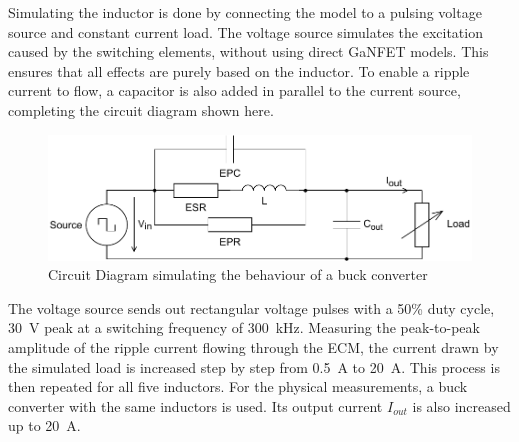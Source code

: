 Simulating the inductor is done by connecting the model to a pulsing voltage source and constant current load. The voltage source simulates the excitation caused by the switching elements, without using direct \ac{GaNFET} models. This ensures that all effects are purely based on the inductor. To enable a ripple current to flow, a capacitor is also added in parallel to the current source, completing the circuit diagram shown here.
\begin{figure}[H]
    \centering
    \includegraphics[width=1\linewidth]{Bilder/Kapitel4/Saturation_Validation_ECM.pdf}
    \caption{Circuit Diagram simulating the behaviour of a buck converter}
    \label{fig:saturation_validation_circuit_diagramm}
\end{figure}
The voltage source sends out rectangular voltage pulses with a 50\% duty cycle, \SI{30}{\V} peak at a switching frequency of \SI{300}{\kilo\Hz}. Measuring the peak-to-peak amplitude of the ripple current flowing through the \ac{ECM}, the current drawn by the simulated load is increased step by step from \SI{0.5}{\A} to \SI{20}{\A}. This process is then repeated for all five inductors. For the physical measurements, a buck converter with the same inductors is used. Its output current $I_{out}$ is also increased up to \SI{20}{A}.\\

